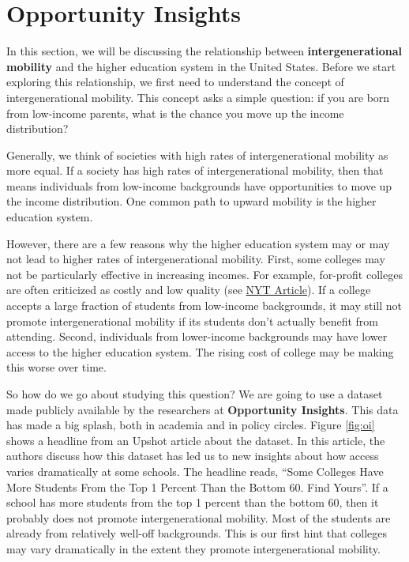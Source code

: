 \documentclass[
]{book}
\begin{document}
\section{Opportunity Insights}\label{opportunity-insights}

In this section, we will be discussing the relationship between \textbf{intergenerational mobility} and the higher education system in the United States. Before we start exploring this relationship, we first need to understand the concept of intergenerational mobility. This concept asks a simple question: if you are born from low-income parents, what is the chance you move up the income distribution?

Generally, we think of societies with high rates of intergenerational mobility as more equal. If a society has high rates of intergenerational mobility, then that means individuals from low-income backgrounds have opportunities to move up the income distribution. One common path to upward mobility is the higher education system.

However, there are a few reasons why the higher education system may or may not lead to higher rates of intergenerational mobility. First, some colleges may not be particularly effective in increasing incomes. For example, for-profit colleges are often criticized as costly and low quality (see \href{https://www.nytimes.com/2020/06/17/business/coronavirus-for-profit-colleges.html}{NYT Article}). If a college accepts a large fraction of students from low-income backgrounds, it may still not promote intergenerational mobility if its students don't actually benefit from attending. Second, individuals from lower-income backgrounds may have lower access to the higher education system. The rising cost of college may be making this worse over time.

So how do we go about studying this question? We are going to use a dataset made publicly available by the researchers at \textbf{Opportunity Insights}. This data has made a big splash, both in academia and in policy circles. Figure \ref{fig:oi} shows a headline from an Upshot article about the dataset. In this article, the authors discuss how this dataset has led us to new insights about how access varies dramatically at some schools. The headline reads, ``Some Colleges Have More Students From the Top 1 Percent Than the Bottom 60. Find Yours''. If a school has more students from the top 1 percent than the bottom 60, then it probably does not promote intergenerational mobility. Most of the students are already from relatively well-off backgrounds. This is our first hint that colleges may vary dramatically in the extent they promote intergenerational mobility.
\end{document}
